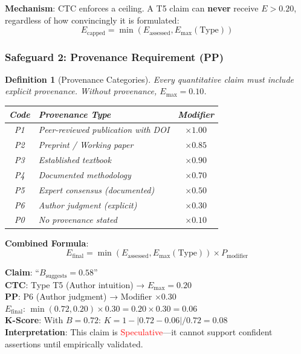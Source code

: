 \documentclass[11pt,a4paper]{article}
\newtheorem{definition}{Definition}[section]
\begin{document}
\textbf{Mechanism}: CTC enforces a ceiling. A T5 claim can \textbf{never} receive $E > 0.20$, regardless of how convincingly it is formulated:
\begin{equation}
E_{\text{capped}} = \min(E_{\text{assessed}}, E_{\max}(\text{Type}))
\end{equation}

\subsubsection{Safeguard 2: Provenance Requirement (PP)}

\begin{definition}[Provenance Categories]
\label{def:provenance}
Every quantitative claim must include explicit provenance. Without provenance, $E_{\max} = 0.10$.

\begin{center}
\begin{tabular}{clc}
\toprule
\textbf{Code} & \textbf{Provenance Type} & \textbf{Modifier} \\
\midrule
P1 & Peer-reviewed publication with DOI & $\times 1.00$ \\
P2 & Preprint / Working paper & $\times 0.85$ \\
P3 & Established textbook & $\times 0.90$ \\
P4 & Documented methodology & $\times 0.70$ \\
P5 & Expert consensus (documented) & $\times 0.50$ \\
P6 & Author judgment (explicit) & $\times 0.30$ \\
P0 & No provenance stated & $\times 0.10$ \\
\bottomrule
\end{tabular}
\end{center}
\end{definition}

\textbf{Combined Formula}:
\begin{equation}
E_{\text{final}} = \min(E_{\text{assessed}}, E_{\max}(\text{Type})) \times P_{\text{modifier}}
\label{eq:E-final}
\end{equation}

\begin{practicalbox}[title={Example: B-Value with CTC + PP}]
\textbf{Claim}: ``$B_{\text{suggests}} = 0.58$'' \\[0.3em]
\textbf{CTC}: Type T5 (Author intuition) → $E_{\max} = 0.20$ \\
\textbf{PP}: P6 (Author judgment) → Modifier $\times 0.30$ \\
\textbf{$E_{\text{final}}$}: $\min(0.72, 0.20) \times 0.30 = 0.20 \times 0.30 = 0.06$ \\[0.3em]
\textbf{K-Score}: With $B = 0.72$: $K = 1 - |0.72 - 0.06| / 0.72 = 0.08$ \\[0.3em]
\textbf{Interpretation}: This claim is \textcolor{red}{Speculative}---it cannot support confident assertions until empirically validated.
\end{practicalbox}
\end{document}
